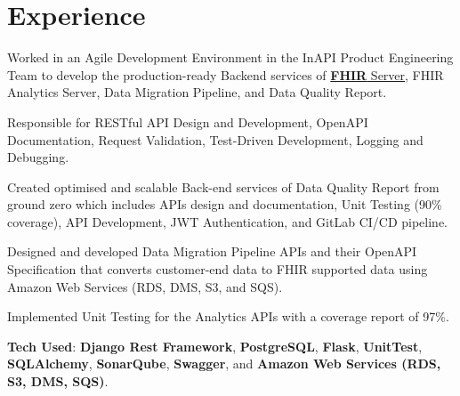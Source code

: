 \documentclass[]{deedy-resume-openfont}
\begin{document}
\begin{minipage}[t]{0.66\textwidth} 

\section{Experience}
\sectionsep
\begin{tightemize}

\item Worked in an Agile Development Environment in the InAPI Product Engineering Team to develop the production-ready Backend services of \href{https://www.hl7.org/fhir/index.html}{\textbf{FHIR} Server}, FHIR Analytics Server, Data Migration Pipeline, and Data Quality Report.

\item Responsible for RESTful API Design and Development, OpenAPI Documentation, Request Validation, Test-Driven Development, Logging and Debugging.



\item Created optimised and scalable Back-end services of Data Quality Report from ground zero which includes APIs design and documentation, Unit Testing (90\% coverage), API Development, JWT Authentication, and GitLab CI/CD pipeline.

\item Designed and developed Data Migration Pipeline APIs and their OpenAPI Specification that converts customer-end data to FHIR supported data using Amazon Web Services (RDS, DMS, S3, and SQS).

\item Implemented Unit Testing for the Analytics APIs with a coverage report of 97\%.

\item \textbf{Tech Used}: \textbf{Django Rest Framework}, \textbf{PostgreSQL}, \textbf{Flask}, \textbf{UnitTest}, \textbf{SQLAlchemy}, \textbf{SonarQube}, \textbf{Swagger}, and \textbf{Amazon Web Services (RDS, S3, DMS, SQS)}. 


\end{tightemize}
\end{minipage}
\end{document}
